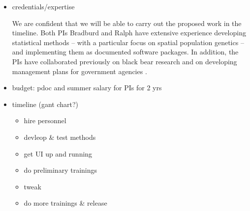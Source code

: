 \documentclass[12pt]{article}
\begin{document}
\begin{itemize}
\item credentials/expertise 

We are confident that we will be able to 
carry out the proposed work in the timeline.
Both PIs Bradburd and Ralph have extensive 
experience developing statistical methods -- 
with a particular focus on spatial population genetics -- 
and implementing them as documented software packages.
In addition, the PIs have collaborated previously 
on black bear research \citep{SpaceMix}
and on developing management plans 
for government agencies \citep{DRECP}. 

\item budget: pdoc and summer salary for PIs for 2 yrs
\item timeline (gant chart?)
\begin{itemize}
\item hire personnel
\item devleop \& test methods
\item get UI up and running
\item do preliminary trainings
\item tweak
\item do more trainings \& release
\end{itemize}
\end{itemize}

\clearpage
%
\end{document}
